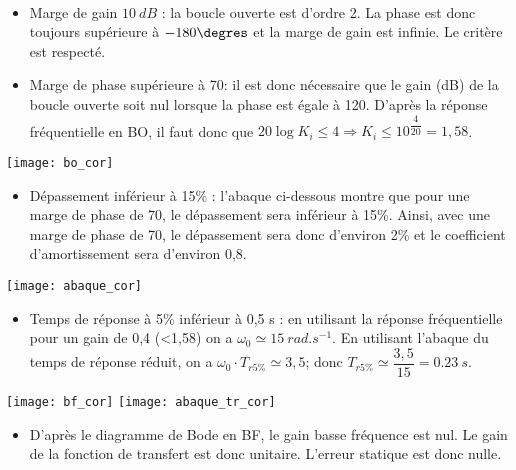 \begin{multicols}{2}
\ifprof
\begin{corrige}~\\
\begin{itemize}
\item Marge de gain $\SI{10}{dB}$ :  la boucle ouverte est d'ordre 2. La phase est donc toujours supérieure à $-180\degres$ et la marge de gain est infinie. Le critère est respecté. 
\item Marge de phase supérieure à 70\degres : il est donc nécessaire que le gain (dB) de la boucle ouverte soit nul lorsque la phase est égale à 120\degres. D'après la réponse fréquentielle en BO, il faut donc que $20\log K_i \leq 4 \Rightarrow K_i \leq  10^{\dfrac{4}{20}}=1,58$.
\end{itemize}

\begin{center}
\texttt{[image: bo\_cor]}
\end{center}

\begin{itemize}
\item Dépassement inférieur à 15\% : l'abaque ci-dessous montre que pour une marge de phase de 70\degres, le dépassement sera inférieur à 15\%. Ainsi, avec une marge de phase de 70\degres, le dépassement sera donc d'environ 2\% et le coefficient d'amortissement sera d'environ 0,8. 
\end{itemize}
\begin{center}
\texttt{[image: abaque\_cor]}
\end{center}
\begin{itemize}
\item Temps de réponse à 5\% inférieur à 0,5 s : en utilisant la réponse fréquentielle pour un gain de 0,4 (<1,58) on a $\omega_0\simeq \SI {15}{rad.s^{-1}}$. En utilisant l'abaque du temps de réponse réduit, on a  $\omega_0 \cdot T_{r5\%}\simeq 3,5$; donc $T_{r5\%}\simeq \dfrac{3,5}{15} = \SI{0,23}{s}$. 

\end{itemize}

\begin{center}
\texttt{[image: bf\_cor]} \hfill
\texttt{[image: abaque\_tr\_cor]}
\end{center}

\begin{itemize}
\item D'après le diagramme de Bode en BF, le gain basse fréquence est nul. Le gain de la fonction de transfert est donc unitaire. L'erreur statique est donc nulle. 
\end{itemize}


\end{corrige}
\end{multicols}

